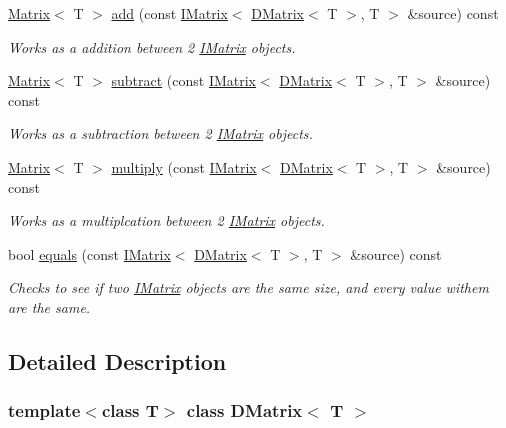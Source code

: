 \begin{DoxyCompactItemize}
\mbox{\hyperlink{class_matrix}{Matrix}}$<$ T $>$ \mbox{\hyperlink{class_d_matrix_ab2ccdeb68a73333d16d6bdae272ca437}{add}} (const \mbox{\hyperlink{class_i_matrix}{I\+Matrix}}$<$ \mbox{\hyperlink{class_d_matrix}{D\+Matrix}}$<$ T $>$, T $>$ \&source) const
\begin{DoxyCompactList}\small\item\em Works as a addition between 2 \mbox{\hyperlink{class_i_matrix}{I\+Matrix}} objects. \end{DoxyCompactList}\item 
\mbox{\hyperlink{class_matrix}{Matrix}}$<$ T $>$ \mbox{\hyperlink{class_d_matrix_a7a06d954882f3853d3e735a6c550a715}{subtract}} (const \mbox{\hyperlink{class_i_matrix}{I\+Matrix}}$<$ \mbox{\hyperlink{class_d_matrix}{D\+Matrix}}$<$ T $>$, T $>$ \&source) const
\begin{DoxyCompactList}\small\item\em Works as a subtraction between 2 \mbox{\hyperlink{class_i_matrix}{I\+Matrix}} objects. \end{DoxyCompactList}\item 
\mbox{\hyperlink{class_matrix}{Matrix}}$<$ T $>$ \mbox{\hyperlink{class_d_matrix_aef4468dd3919416a12fbde911b653a8e}{multiply}} (const \mbox{\hyperlink{class_i_matrix}{I\+Matrix}}$<$ \mbox{\hyperlink{class_d_matrix}{D\+Matrix}}$<$ T $>$, T $>$ \&source) const
\begin{DoxyCompactList}\small\item\em Works as a multiplcation between 2 \mbox{\hyperlink{class_i_matrix}{I\+Matrix}} objects. \end{DoxyCompactList}\item 
bool \mbox{\hyperlink{class_d_matrix_a8a8826ba4911a6a8ec3c0fe2f2d494df}{equals}} (const \mbox{\hyperlink{class_i_matrix}{I\+Matrix}}$<$ \mbox{\hyperlink{class_d_matrix}{D\+Matrix}}$<$ T $>$, T $>$ \&source) const
\begin{DoxyCompactList}\small\item\em Checks to see if two \mbox{\hyperlink{class_i_matrix}{I\+Matrix}} objects are the same size, and every value withem are the same. \end{DoxyCompactList}\end{DoxyCompactItemize}


\subsection{Detailed Description}
\subsubsection*{template$<$class T$>$\newline
class D\+Matrix$<$ T $>$}

